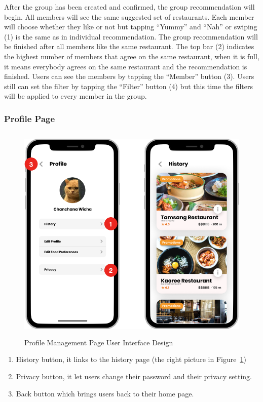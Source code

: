 \documentclass[12pt,oneside,openright,a4paper]{cpe-english-project}
\begin{document}
After the group has been created and confirmed, the group recommendation will begin. All members will see the same suggested set of restaurants. Each member will choose whether they like or not but tapping “Yummy” and “Nah” or swiping (1) is the same as in individual recommendation. The group recommendation will be finished after all members like the same restaurant. The top bar (2) indicates the highest number of members that agree on the same restaurant, when it is full, it means everybody agrees on the same restaurant and the recommendation is finished. Users can see the members by tapping the “Member” button (3). Users still can set the filter by tapping the “Filter” button (4) but this time the filters will be applied to every member in the group.

\newpage
\subsubsection{Profile Page}
\begin{figure}[H]\centering
\includegraphics[height=300pt]{./images/3ui_ProfileManagementPageUserInterfaceDesign.png}
\caption{Profile Management Page User Interface Design}\label{fig:3ui_ProfileManagementPageUserInterfaceDesign}
\end{figure}

\begin{enumerate}
\item History button, it links to the history page (the right picture in Figure~\ref{fig:3ui_ProfileManagementPageUserInterfaceDesign})
\item Privacy button, it let users change their password and their privacy setting.
\item Back button which brings users back to their home page.
\end{enumerate}
\end{document}
